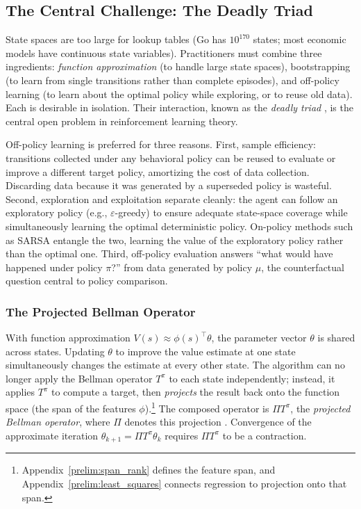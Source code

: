 \FloatBarrier
\subsection{The Central Challenge: The Deadly Triad}
\label{sec:deadly_triad}

State spaces are too large for lookup tables (Go has $10^{170}$ states; most economic models have continuous state variables). Practitioners must combine three ingredients: \textit{function approximation} (to handle large state spaces), bootstrapping (to learn from single transitions rather than complete episodes), and off-policy learning (to learn about the optimal policy while exploring, or to reuse old data). Each is desirable in isolation. Their interaction, known as the \emph{deadly triad} \citep[Ch.~11]{sutton2018}, is the central open problem in reinforcement learning theory.

Off-policy learning is preferred for three reasons. First, sample efficiency: transitions collected under any behavioral policy can be reused to evaluate or improve a different target policy, amortizing the cost of data collection. Discarding data because it was generated by a superseded policy is wasteful. Second, exploration and exploitation separate cleanly: the agent can follow an exploratory policy (e.g., $\varepsilon$-greedy) to ensure adequate state-space coverage while simultaneously learning the optimal deterministic policy. On-policy methods such as SARSA entangle the two, learning the value of the exploratory policy rather than the optimal one. Third, off-policy evaluation answers ``what would have happened under policy $\pi$?'' from data generated by policy $\mu$, the counterfactual question central to policy comparison.

\subsubsection{The Projected Bellman Operator}

With function approximation $V(s) \approx \phi(s)^\top \theta$, the parameter vector $\theta$ is shared across states. Updating $\theta$ to improve the value estimate at one state simultaneously changes the estimate at every other state. The algorithm can no longer apply the Bellman operator $T^\pi$ to each state independently; instead, it applies $T^\pi$ to compute a target, then \emph{projects} the result back onto the function space (the span of the features $\phi$).\footnote{Appendix~\ref{prelim:span_rank} defines the feature span, and Appendix~\ref{prelim:least_squares} connects regression to projection onto that span.} The composed operator is $\Pi T^\pi$, the \textit{projected Bellman operator}, where $\Pi$ denotes this projection \citep{tsitsiklis1997}. Convergence of the approximate iteration $\theta_{k+1} = \Pi T^\pi \theta_k$ requires $\Pi T^\pi$ to be a contraction.

